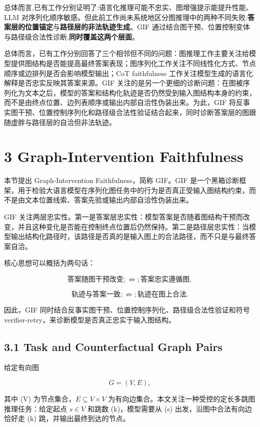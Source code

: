\documentclass[
  11pt,
]{article}
\begin{document}
总体而言,已有工作分别证明了:语言化推理可能不忠实、图增强提示能提升性能、LLM
对序列化顺序敏感。但此前工作尚未系统地区分图推理中的两种不同失败:\textbf{答案层的位置锚定}与\textbf{路径层的非法轨迹生成}。GIF
通过结合图干预、位置控制变体与路径级合法性诊断,\textbf{同时覆盖这两个层面}。

总体而言，已有工作分别回答了三个相邻但不同的问题：图推理工作主要关注给模型提供图结构是否能提高最终答案表现；图序列化工作关注不同线性化方式、节点顺序或边排列是否会影响模型输出；CoT
faithfulness 工作关注模型生成的语言化解释是否忠实反映其答案来源。GIF
关注的是另一个更细的诊断问题：在图被序列化为文本之后，模型的答案和结构化轨迹是否仍然受到输入图结构本身的约束，而不是由终点位置、边列表顺序或输出内部自洽性伪装出来。为此，GIF
将反事实图干预、位置控制序列化和路径级合法性验证结合起来，同时诊断答案层的图跟随虚胖与路径层的自洽但非法轨迹。

\section{3 Graph-Intervention
Faithfulness}\label{graph-intervention-faithfulness}

本节提出 Graph-Intervention Faithfulness，简称 GIF。GIF
是一个黑箱诊断框架，用于检验大语言模型在序列化图任务中的行为是否真正受输入图结构约束，而不是由文本位置线索、答案先验或输出内部自洽性伪装出来。

GIF
关注两层忠实性。第一是答案层忠实性：模型答案是否随着图结构干预而改变，并且这种变化是否能在控制终点位置后仍然保持。第二是路径层忠实性：当模型输出结构化路径时，该路径是否真的是输入图上的合法路径，而不只是与最终答案自洽。

核心思想可以概括为两句话：

\[
\text{答案随图干预改变} ;\not\Rightarrow; \text{答案忠实遵循图},  
\]

\[
\text{轨迹与答案一致} ;\not\Rightarrow; \text{轨迹在图上合法}.  
\]

因此，GIF 同时结合反事实图干预、位置控制序列化、路径级合法性验证和符号
verifier-retry，来诊断模型是否真正忠实于输入图结构。

\subsection{3.1 Task and Counterfactual Graph
Pairs}\label{task-and-counterfactual-graph-pairs}

给定有向图

\[
G=(V,E),  
\]

其中 (V) 为节点集合，\(E\subseteq V\times V\)
为有向边集合。本文关注一种受控的定长多跳图推理任务：给定起点 \(s\in V\)
和跳数 (k)，模型需要从 (s) 出发，沿图中合法有向边恰好走 (k)
跳，并输出最终到达的节点。
\end{document}
